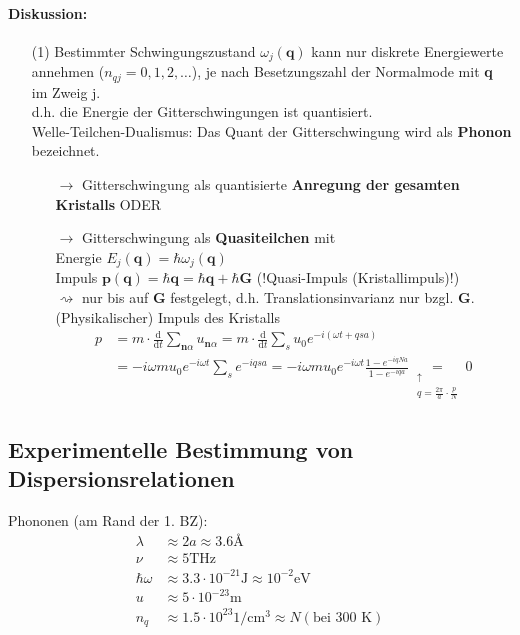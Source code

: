 \paragraph{Diskussion:}
\begin{itemize}
	\item[(1)] Bestimmter Schwingungszustand $\omega_j(\textbf{q})$ kann nur diskrete Energiewerte annehmen ($n_{qj} = 0,1,2,\dots$), je nach Besetzungszahl der Normalmode mit \textbf{q} im Zweig j.\\
	d.h. die Energie der Gitterschwingungen ist quantisiert.\\
	Welle-Teilchen-Dualismus: Das Quant der Gitterschwingung wird als \textbf{Phonon} bezeichnet.
	\begin{itemize}
		\item[$\rightarrow$] Gitterschwingung als quantisierte \textbf{Anregung der gesamten Kristalls} ODER
		\item[$\rightarrow$] Gitterschwingung als \textbf{Quasiteilchen} mit\\
		Energie $E_j(\textbf{q}) = \hbar \omega_j(\textbf{q})$\\
		Impuls $\textbf{p} ( \textbf{q}) = \hbar \textbf{q} = \hbar \textbf{q} + \hbar \textbf{G} $ (!Quasi-Impuls (Kristallimpuls)!)\\
		$\rightsquigarrow$ nur bis auf \textbf{G} festgelegt, d.h. Translationsinvarianz nur bzgl. \textbf{G}. (Physikalischer) Impuls des Kristalls
		\begin{align*}
			p &= m \cdot \frac{\mathrm{d}}{\mathrm{d}t} \sum_{\textbf{n} \alpha} u_{\textbf{n} \alpha} = m \cdot \frac{\mathrm{d}}{\mathrm{d}t} \sum_s u_0 e^{-i(\omega t + q  s a)}\\
			&= -i \omega m u_0 e^{-i \omega t} \sum_s e^{-i q s a} = -i \omega m u_0 e^{-i \omega t} \frac{1 - e^{-i q N a}}{1 - e^{-i q a}} \underset{\begin{matrix}
				\uparrow\\ 
				q = \frac{2 \pi}{a} \cdot \frac{p}{N}
			\end{matrix}}{=} 0
		\end{align*}
	\end{itemize}
\end{itemize}


\subsection{Experimentelle Bestimmung von Dispersionsrelationen} \label{kap:4_5}

Phononen (am Rand der 1. BZ):
\begin{align*}
	\lambda &\approx 2a \approx 3.6 \text{\AA}\\
	\nu &\approx 5 \text{THz}\\
	\hbar \omega &\approx 3.3 \cdot 10^{-21} \text{J} \approx 10^{-2} \text{eV}\\
	u &\approx 5 \cdot 10^{-23} \text{m}\\
	n_q &\approx 1.5 \cdot 10^{23} 1/\text{cm}^3 \approx N (\text{bei 300 K})
\end{align*}

